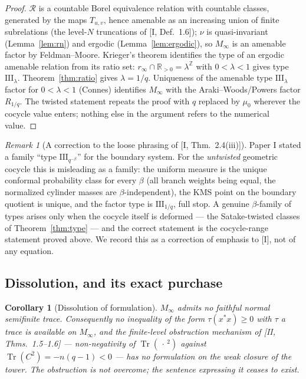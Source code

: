 \documentclass[11pt]{amsart}
\numberwithin{equation}{section}
\newtheorem{corollary}[theorem]{Corollary}
\theoremstyle{definition}
\theoremstyle{remark}
\newtheorem{remark}[theorem]{Remark}
\newcommand{\Z}{\mathbb{Z}}
\newcommand{\R}{\mathbb{R}}
\newcommand{\cR}{\mathcal{R}}
\newcommand{\Tr}{\operatorname{Tr}}
\begin{document}
\begin{proof}
$\cR$ is a countable Borel equivalence relation with countable classes, generated by
the maps $T_{u,v}$, hence amenable as an increasing union of finite subrelations
(the level-$N$ truncations of [I, Def.~1.6]); $\nu$ is quasi-invariant
(Lemma~\ref{lem:rn}) and ergodic (Lemma~\ref{lem:ergodic}), so $M_\infty$ is an
amenable factor by Feldman--Moore. Krieger's theorem identifies the type of an ergodic
amenable relation from its ratio set: $r_\infty\cap\R_{>0}=\lambda^{\Z}$ with
$0<\lambda<1$ gives type $\mathrm{III}_\lambda$. Theorem~\ref{thm:ratio} gives
$\lambda=1/q$. Uniqueness of the amenable type $\mathrm{III}_\lambda$ factor for
$0<\lambda<1$ (Connes) identifies $M_\infty$ with the Araki--Woods/Powers factor
$R_{1/q}$. The twisted statement repeats the proof with $q$ replaced by $\mu_0$
wherever the cocycle value enters; nothing else in the argument refers to the
numerical value.
\end{proof}

\begin{remark}[A correction to the loose phrasing of {[I, Thm.~2.4(iii)]}]
\label{rem:correction}
Paper I stated a family ``type $\mathrm{III}_{q^{-\beta}}$'' for the boundary system.
For the \emph{untwisted} geometric cocycle this is misleading as a family: the uniform
measure is the unique conformal probability class for every $\beta$ (all branch
weights being equal, the normalized cylinder masses are $\beta$-independent), the KMS
point on the boundary quotient is unique, and the factor type is
$\mathrm{III}_{1/q}$, full stop. A genuine $\beta$-family of types arises only when
the cocycle itself is deformed --- the Satake-twisted classes of
Theorem~\ref{thm:type} --- and the correct statement is the cocycle-range statement
proved above. We record this as a correction of emphasis to [I], not of any equation.
\end{remark}

\subsection{Dissolution, and its exact purchase}

\begin{corollary}[Dissolution of formulation]\label{cor:dissolve}
$M_\infty$ admits no faithful normal semifinite trace. Consequently no inequality of
the form $\tau(x^*x)\ge0$ with $\tau$ a trace is available on $M_\infty$, and the
finite-level obstruction mechanism of [II, Thms.~1.5--1.6] --- non-negativity of
$\Tr(\,\cdot\,^2)$ against $\Tr(C^2)=-n(q-1)<0$ --- has no formulation on the weak
closure of the tower. The obstruction is not overcome; the sentence expressing it
ceases to exist.
\end{corollary}
\end{document}
